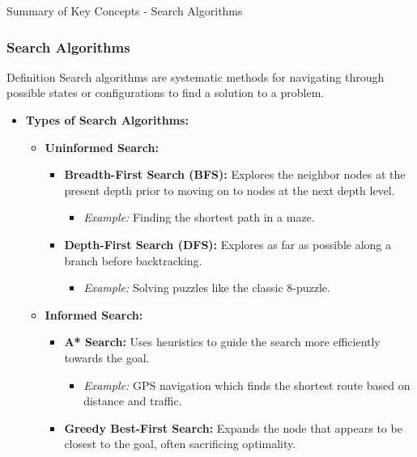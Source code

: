 \documentclass[aspectratio=169]{beamer}
\begin{document}
\begin{frame}[fragile]{Summary of Key Concepts - Search Algorithms}
    \frametitle{Search Algorithms}
    \begin{block}{Definition}
        Search algorithms are systematic methods for navigating through possible states or configurations to find a solution to a problem.
    \end{block}
    
    \begin{itemize}
        \item \textbf{Types of Search Algorithms:}
            \begin{itemize}
                \item \textbf{Uninformed Search:}
                    \begin{itemize}
                        \item \textbf{Breadth-First Search (BFS):} 
                            Explores the neighbor nodes at the present depth prior to moving on to nodes at the next depth level.
                            \begin{itemize}
                                \item \textit{Example:} Finding the shortest path in a maze.
                            \end{itemize}
                        \item \textbf{Depth-First Search (DFS):} 
                            Explores as far as possible along a branch before backtracking.
                            \begin{itemize}
                                \item \textit{Example:} Solving puzzles like the classic 8-puzzle.
                            \end{itemize}
                    \end{itemize}

                \item \textbf{Informed Search:}
                    \begin{itemize}
                        \item \textbf{A* Search:} 
                            Uses heuristics to guide the search more efficiently towards the goal.
                            \begin{itemize}
                                \item \textit{Example:} GPS navigation which finds the shortest route based on distance and traffic.
                            \end{itemize}
                        \item \textbf{Greedy Best-First Search:} 
                            Expands the node that appears to be closest to the goal, often sacrificing optimality.
                    \end{itemize}
            \end{itemize}
    \end{itemize}


\end{frame}
\end{document}
